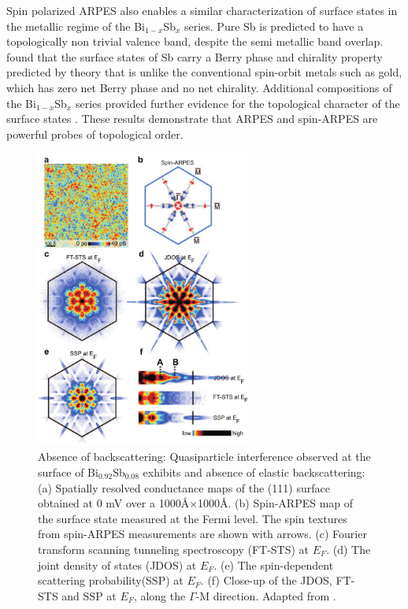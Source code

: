 \documentclass[twocolumn,floatfix,showpacs,rmp,aps]{revtex4}
\begin{document}
Spin polarized ARPES also enables a similar characterization of
surface states in the metallic regime of
the Bi$_{1-x}$Sb$_x$ series.  Pure Sb is predicted to have a topologically non
trivial valence band, despite the semi metallic band overlap.
\textcite{hsieh09a} found that the surface states of Sb carry
a Berry phase and chirality property predicted by theory \cite{teofukane08}
that is unlike the conventional spin-orbit metals such as gold, which has
zero net Berry phase and no net chirality.
Additional compositions of the Bi$_{1-x}$Sb$_x$ series provided further
evidence for the topological character of the surface states \cite{nishide10}.
These results demonstrate that ARPES and spin-ARPES are powerful probes of topological
order.

\begin{figure}
\includegraphics[width=2.8in]{Fig11}
\caption{ Absence of backscattering:
Quasiparticle interference observed at the surface of Bi$_{0.92}$Sb$_{0.08}$
exhibits and
absence of elastic backscattering: (a) Spatially resolved conductance
maps of the (111) surface obtained at 0 mV
over a 1000\AA$\times$1000\AA. (b) Spin-ARPES map of the
surface state measured at the Fermi level. The spin textures from
spin-ARPES measurements are shown with arrows. (c) Fourier transform
scanning tunneling spectroscopy (FT-STS) at $E_F$. (d) The joint
density of states (JDOS) at $E_F$. (e) The spin-dependent scattering
probability(SSP) at $E_F$. (f) Close-up of the JDOS, FT-STS
and SSP at $E_F$, along the $\Gamma$-M direction.  Adapted from
.}
\label{fig:zfig3}
\end{figure}
\end{document}
